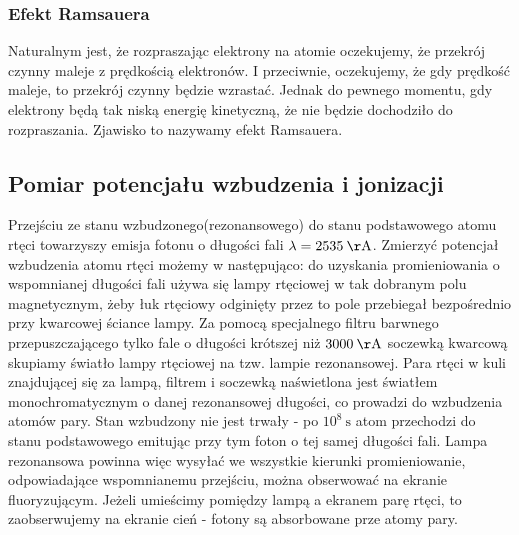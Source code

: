 \documentclass[paper=a4, fontsize=12pt]{scrartcl}
\begin{document}
\subsubsection{Efekt Ramsauera}
Naturalnym jest, że rozpraszając elektrony na atomie oczekujemy, że przekrój czynny maleje z prędkością elektronów. I przeciwnie, oczekujemy, że gdy prędkość maleje, to przekrój czynny będzie wzrastać. Jednak do pewnego momentu, gdy elektrony będą tak niską energię kinetyczną, że nie będzie dochodziło do rozpraszania.
Zjawisko to nazywamy efekt Ramsauera.		
\subsection{Pomiar potencjału wzbudzenia i jonizacji}
Przejściu ze stanu wzbudzonego(rezonansowego) do stanu podstawowego atomu rtęci towarzyszy emisja fotonu o długości fali $\lambda =2535\:\mathrm{\AA}$. Zmierzyć potencjał wzbudzenia atomu rtęci możemy w następująco: do uzyskania promieniowania o wspomnianej długości fali używa się lampy rtęciowej w tak dobranym polu magnetycznym, żeby łuk rtęciowy odginięty przez to pole przebiegał bezpośrednio przy kwarcowej ściance lampy. Za pomocą specjalnego filtru barwnego przepuszczającego tylko fale o długości krótszej niż $3000\:\mathrm{\AA}$ soczewką kwarcową skupiamy światło lampy rtęciowej na tzw. lampie rezonansowej. Para rtęci w kuli znajdującej się za lampą, filtrem i soczewką naświetlona jest światłem monochromatycznym o danej rezonansowej długości, co prowadzi do wzbudzenia atomów pary. Stan wzbudzony nie jest trwały - po $10^{8}\:\mathrm{ s}$ atom przechodzi do stanu podstawowego emitując przy tym foton o tej samej długości fali. Lampa rezonansowa powinna więc wysyłać we wszystkie kierunki promieniowanie, odpowiadające wspomnianemu przejściu, można obserwować na ekranie fluoryzującym. Jeżeli umieścimy pomiędzy lampą a ekranem parę rtęci, to zaobserwujemy na ekranie cień - fotony są absorbowane prze atomy pary. 
		

		
\end{document}
